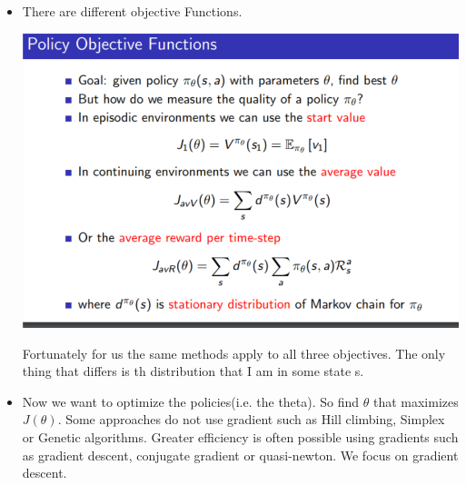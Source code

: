 \documentclass[a4paper]{article}
\begin{document}
\begin{itemize}
\begin{center}
    \end{center}
    \item There are different objective Functions. 

      \begin{center}
    \includegraphics[width = \textwidth]{images/policy_goals.png}
    \end{center}
    Fortunately for us the same methods apply to all three objectives. The only thing that differs is th distribution that I am in some state s. 
    \item Now we want to optimize the policies(i.e. the theta). So find $\theta$ that maximizes $J(\theta)$. Some approaches do not use gradient such as Hill climbing, Simplex or Genetic algorithms. Greater efficiency is often possible using gradients such as gradient descent, conjugate gradient or quasi-newton. We focus on gradient descent. 
    \end{itemize}

    
\end{document}
